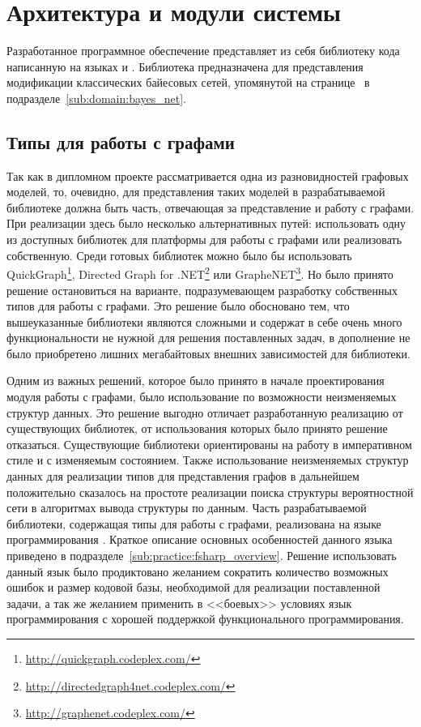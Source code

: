 \section{Архитектура и модули системы} %
\label{sec:arch_and_mod}

Разработанное программное обеспечение представляет из себя библиотеку кода написанную на языках \fsharp{} и \csharp{}.
Библиотека предназначена для представления модификации классических байесовых сетей, упомянутой на странице~\pageref{page:domain:bayes_mod} в подразделе~\ref{sub:domain:bayes_net}.

\subsection{Типы для работы с графами}
\label{sub:arch_and_mod:graphlib}

Так как в дипломном проекте рассматривается одна из разновидностей графовых моделей, то, очевидно, для представления таких моделей в разрабатываемой библиотеке должна быть часть, отвечающая за представление и работу с графами.
При реализации здесь было несколько альтернативных путей: использовать одну из доступных библиотек для платформы \dotnet{} для работы с графами или реализовать собственную.
Среди готовых библиотек можно было бы использовать QuickGraph\footnote{\url{http://quickgraph.codeplex.com/}}, Directed Graph for .NET\footnote{\url{http://directedgraph4net.codeplex.com/}} или GrapheNET\footnote{\url{http://graphenet.codeplex.com/}}.
Но было принято решение остановиться на варианте, подразумевающем разработку собственных типов для работы с графами.
Это решение было обосновано тем, что вышеуказанные библиотеки являются сложными и содержат в себе очень много функциональности не нужной для решения поставленных задач, в дополнение не было приобретено лишних мегабайтовых внешних зависимостей для библиотеки.

Одним из важных решений, которое было принято в начале проектирования модуля работы с графами, было использование по возможности неизменяемых структур данных.
Это решение выгодно отличает разработанную реализацию от существующих библиотек, от использования которых было принято решение отказаться. 
Существующие библиотеки ориентированы на работу в императивном стиле и с изменяемым состоянием.
Также использование неизменяемых структур данных для реализации типов для представления графов в дальнейшем положительно сказалось на простоте реализации поиска структуры вероятностной сети в алгоритмах вывода структуры по данным.
Часть разрабатываемой библиотеки, содержащая типы для работы с графами, реализована на языке программирования \fsharp{}.
Краткое описание основных особенностей данного языка приведено в подразделе~\ref{sub:practice:fsharp_overview}.
Решение использовать данный язык было продиктовано желанием сократить количество возможных ошибок и размер кодовой базы, необходимой для реализации поставленной задачи, а так же желанием применить в <<боевых>> условиях язык программирования с хорошей поддержкой функционального программирования.


